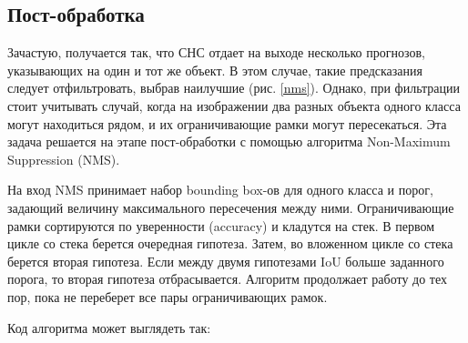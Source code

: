 \subsection{Пост-обработка}

Зачастую, получается так, что СНС отдает на выходе несколько прогнозов, указывающих на один и тот же объект. В этом случае, такие предсказания следует отфильтровать, выбрав наилучшие (рис. \ref{nms}). Однако, при фильтрации стоит учитывать случай, когда на изображении два разных объекта одного класса могут находиться рядом, и их ограничивающие рамки могут пересекаться. Эта задача решается на этапе пост-обработки с помощью алгоритма Non-Maximum Suppression (NMS).


На вход NMS принимает набор bounding box-ов для одного класса и порог, задающий величину максимального пересечения между ними. Ограничивающие рамки сортируются по уверенности (accuracy) и кладутся на стек. В первом цикле со стека берется очередная гипотеза. Затем, во вложенном цикле со стека берется вторая гипотеза. Если между двумя гипотезами IoU больше заданного порога, то вторая гипотеза отбрасывается. Алгоритм продолжает работу до тех пор, пока не переберет все пары ограничивающих рамок.

Код алгоритма может выглядеть так:

